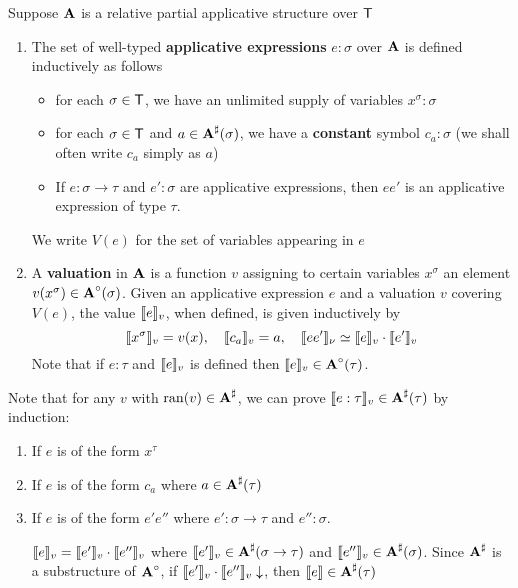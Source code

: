 \documentclass[11pt]{article}
\begin{document}
\begin{definition}[]
Suppose \(\operatorname{\textbf{A}}\) is a relative partial applicative structure over \(\textsf{T}\)
\begin{enumerate}
\item The set of well-typed \textbf{applicative expressions} \(e:\sigma\) over \(\operatorname{\textbf{A}}\) is defined inductively as
follows
\begin{itemize}
\item for each \(\sigma\in\textsf{T}\), we have an unlimited supply of variables \(x^\sigma:\sigma\)
\item for each \(\sigma\in\textsf{T}\) and \(a\in\operatorname{\textbf{A}}^\sharp(\sigma)\), we have a \textbf{constant} symbol \(c_a:\sigma\) (we shall often
write \(c_a\) simply as \(a\))
\item If \(e:\sigma\to\tau\) and \(e':\sigma\) are applicative expressions, then \(ee'\) is an applicative
expression of type \(\tau\).
\end{itemize}

We write \(V(e)\) for the set of variables appearing in \(e\)

\item A \textbf{valuation} in \(\operatorname{\textbf{A}}\) is a function \(v\) assigning to certain variables \(x^\sigma\) an
element \(v(x^\sigma)\in\operatorname{\textbf{A}}^\circ(\sigma)\). Given an applicative expression \(e\) and a valuation \(v\)
covering \(V(e)\), the value \(\llbracket e \rrbracket_v\), when defined, is given inductively by
\begin{equation*}
\llbracket x^\sigma \rrbracket_v=v(x),\quad\llbracket c_a \rrbracket_v=a,\quad\llbracket ee' \rrbracket_\nu\simeq\llbracket e \rrbracket_v\cdot\llbracket e' \rrbracket_v
\end{equation*}
Note that if \(e:\tau\) and \(\llbracket e \rrbracket_v\) is defined then \(\llbracket e \rrbracket_v\in\operatorname{\textbf{A}}^\circ(\tau)\).
\end{enumerate}
\end{definition}

Note that for any \(v\) with \(\operatorname{ran}(v)\in\operatorname{\textbf{A}}^\sharp\), we can prove \(\llbracket e:\tau \rrbracket_v\in\operatorname{\textbf{A}}^\sharp(\tau)\) by induction:
\begin{enumerate}
\item If \(e\) is of the form \(x^\tau\)
\item If \(e\) is of the form \(c_a\) where \(a\in\operatorname{\textbf{A}}^\sharp(\tau)\)
\item If \(e\) is of the form \(e'e''\) where \(e':\sigma\to\tau\) and \(e'':\sigma\).

\(\llbracket e \rrbracket_v=\llbracket e' \rrbracket_v\cdot\llbracket e'' \rrbracket_v\) where \(\llbracket e' \rrbracket_v\in\operatorname{\textbf{A}}^\sharp(\sigma\to\tau)\) and \(\llbracket e'' \rrbracket_v\in\operatorname{\textbf{A}}^\sharp(\sigma)\).
Since \(\operatorname{\textbf{A}}^\sharp\) is a substructure of \(\operatorname{\textbf{A}}^\circ\), if \(\llbracket e' \rrbracket_v\cdot\llbracket e'' \rrbracket_v\downarrow\), then \(\llbracket e \rrbracket\in\operatorname{\textbf{A}}^\sharp(\tau)\)
\end{enumerate}
\end{document}
